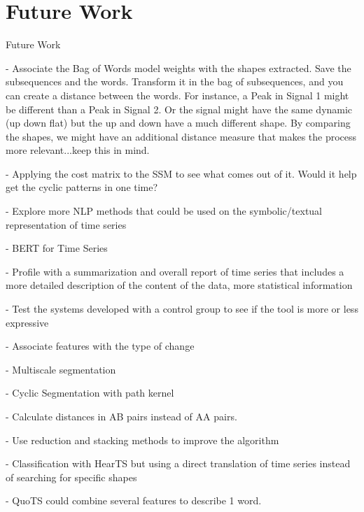 
%


\chapter{Future Work}
\label{cha:future}

Future Work

- Associate the Bag of Words model weights with the shapes extracted. Save the subsequences and the words. Transform it in the bag of subsequences, and you can create a distance between the words. For instance, a Peak in Signal 1 might be different than a Peak in Signal 2. Or the signal might have the same dynamic (up down flat) but the up and down have a much different shape. By comparing the shapes, we might have an additional distance measure that makes the process more relevant...keep this in mind.

- Applying the cost matrix to the SSM to see what comes out of it. Would it help get the cyclic patterns in one time?

- Explore more NLP methods that could be used on the symbolic/textual representation of time series

- BERT for Time Series

- Profile with a summarization and overall report of time series that includes a more detailed description of the content of the data, more statistical information

- Test the systems developed with a control group to see if the tool is more or less expressive

- Associate features with the type of change

- Multiscale segmentation

- Cyclic Segmentation with path kernel

- Calculate distances in AB pairs instead of AA pairs.

- Use reduction and stacking methods to improve the algorithm

- Classification with HearTS but using a direct translation of time series instead of searching for specific shapes

- QuoTS could combine several features to describe 1 word.


